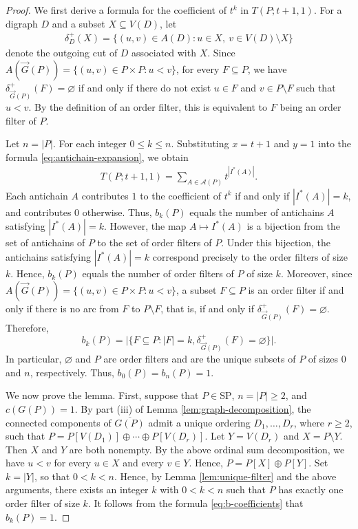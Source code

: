 \documentclass[10pt,a4paper]{amsart}
\begin{document}
\begin{proof}
We first derive a formula for the coefficient of $t^k$ in $T(P;t+1,1)$.
For a digraph $D$ and a subset $X\subseteq V(D)$, let
\begin{eqnarray*}
\delta_D^+(X)=\{(u,v)\in A(D):u\in X,\ v\in V(D)\setminus X\}
\end{eqnarray*}
denote the outgoing cut of $D$ associated with $X$.
Since $A(\vec G(P))=\{(u,v)\in P\times P:u<v\}$, for every $F\subseteq P$, 
we have $\delta_{\vec G(P)}^+(F)=\varnothing$ if and only if
there do not exist $u\in F$ and $v\in P\setminus F$ such that $u<v$.
By the definition of an order filter, this is equivalent
to $F$ being an order filter of $P$.

Let $n=|P|$.
For each integer $0\leq k\leq n$. %
Substituting $x=t+1$ and $y=1$ into the formula \eqref{eq:antichain-expansion}, we obtain
\begin{eqnarray*}
T(P;t+1,1)=\sum_{A\in\mathcal A(P)}t^{|I^*(A)|}.
\end{eqnarray*}
Each antichain $A$ contributes $1$ to the coefficient of $t^k$
if and only if $|I^*(A)|=k$, and contributes $0$ otherwise.
Thus, $b_k(P)$ equals the number of antichains $A$ satisfying $|I^*(A)|=k$.
However, the map $A\mapsto I^*(A)$ is a bijection from the set
of antichains of $P$ to the set of order filters of $P$.
Under this bijection, the antichains satisfying $|I^*(A)|=k$
correspond precisely to the order filters of size $k$.
Hence, $b_k(P)$ equals the number of order filters of $P$ of size $k$.
Moreover, since $A(\vec G(P))=\{(u,v)\in P\times P:u<v\}$,
a subset $F\subseteq P$ is an order filter if and only if
there is no arc from $F$ to $P\setminus F$,
that is, if and only if $\delta_{\vec G(P)}^+(F)=\varnothing$. Therefore,
\begin{equation}\label{eq:b-coefficients}
b_k(P)=\bigl|\{F\subseteq P:|F|=k,\delta_{\vec G(P)}^+(F)=\varnothing\}\bigr|.
\end{equation}
In particular, $\varnothing$ and $P$ are order filters
and are the unique subsets of $P$ of sizes $0$ and $n$, respectively.
Thus, $b_0(P)=b_n(P)=1$.

We now prove the lemma. 
First, suppose that $P\in\mathrm{SP}$, $n=|P|\geq 2$, and $c(G(P))=1$.
By part \textup{(iii)} of Lemma \ref{lem:graph-decomposition},
the connected components of $\overline{G(P)}$ admit a unique ordering $D_1,\ldots,D_r$, 
where $r\geq2$, such that $P=P[V(D_1)]\oplus\cdots\oplus P[V(D_r)]$.
Let $Y=V(D_r)$ and $X=P\setminus Y$. Then $X$ and $Y$ are both nonempty.
By the above ordinal sum decomposition, we have $u<v$ for every $u\in X$ and every $v\in Y$.
Hence, $P=P[X]\oplus P[Y]$. Set $k=|Y|$, so that $0<k<n$.
Hence, by Lemma \ref{lem:unique-filter} and the above arguments,
there exists an integer $k$ with $0<k<n$
such that $P$ has exactly one order filter of size $k$.
It follows from the formula \eqref{eq:b-coefficients} that $b_k(P)=1$.


\end{proof}
\end{document}
